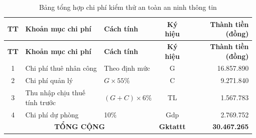 \begin{longtable}{|c|p{4.5cm}|p{3.5cm}|c|r|}
\caption{Bảng tổng hợp chi phí kiểm thử an toàn an ninh thông tin \label{tab:chi_phi_ktattt}} \\
\hline
\textbf{TT} & \textbf{Khoản mục chi phí} & \textbf{Cách tính} & \textbf{Ký hiệu} & \textbf{Thành tiền (đồng)} \\ \hline
\endfirsthead
\hline
\textbf{TT} & \textbf{Khoản mục chi phí} & \textbf{Cách tính} & \textbf{Ký hiệu} & \textbf{Thành tiền (đồng)} \\ \hline
\endhead
\hline
1 & Chi phí thuê nhân công & Theo định mức & G & 16.857.890 \\ \hline
2 & Chi phí quản lý & $G\times 55\%$ & C & 9.271.840 \\ \hline
3 & Thu nhập chịu thuế tính trước & $(G+C)\times 6\%$ & TL & 1.567.783 \\ \hline
4 & Chi phí dự phòng & 10\% & Gdp & 2.769.752 \\ \hline
\multicolumn{3}{|c|}{\textbf{TỔNG CỘNG}} & \textbf{Gktattt} & \textbf{30.467.265} \\ \hline
\end{longtable}
